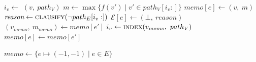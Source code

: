 \begin{algorithm}
    \caption{Implementation of $\mathsf{NoOpponentCycle}$ as filter remembering best payoffs (Memo)}
    \small
    \begin{algorithmic}[1]
            \State $i_v \gets$ $(v,\ path_V)$
            \State $m \gets \max\{f(v') \mid v' \in path_V[i_v:]\}$
            \State $\textit{memo}[e] \gets (v,\ m)$
                \State $\textit{reason} \gets \textproc{clausify}(\neg path_E[i_v:])$
                \State $\mathcal{E}[e] \gets (\bot,\ \textit{reason})$
            \EndIf
                \State $(v_{memo},\ m_{memo}) \gets \textit{memo}[e']$
                    \State {}
                \Else
                    \State $i_v \gets \textproc{index}(v_{memo},\ path_V)$
                        \State {}
                    \Else
                        \State $\textit{memo}[e] \gets \textit{memo}[e']$
                    \EndIf
                \EndIf
            \EndFor
        \EndIf
    \EndFunction
    \end{algorithmic}
    \label{alg:noc-memo}
\end{algorithm}


\begin{algorithm}[H]
    \caption{Propagator using NOCMemo}
    \begin{algorithmic}[1]
        \State $\textit{memo} \gets \{e \mapsto (-1, -1) \mid e \in E\}$
        \State {}
    \EndFunction
    \end{algorithmic}
    \label{alg:propagator-noc-memo}
\end{algorithm}